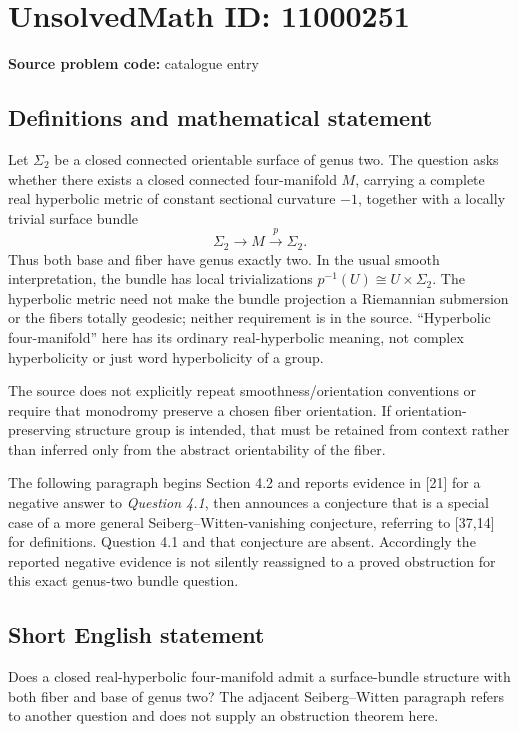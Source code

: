 \documentclass[11pt]{article}
\begin{document}
\section*{UnsolvedMath ID: 11000251}
\textbf{Source problem code:} catalogue entry
\subsection{Definitions and mathematical statement}
Let \(\Sigma_2\) be a closed connected orientable surface of genus two. The question asks whether there exists a closed connected four-manifold \(M\), carrying a complete real hyperbolic metric of constant sectional curvature \(-1\), together with a locally trivial surface bundle
\[\Sigma_2\longrightarrow M\xrightarrow{p}\Sigma_2.\]
Thus both base and fiber have genus exactly two. In the usual smooth interpretation, the bundle has local trivializations \(p^{-1}(U)\cong U\times\Sigma_2\). The hyperbolic metric need not make the bundle projection a Riemannian submersion or the fibers totally geodesic; neither requirement is in the source. ``Hyperbolic four-manifold'' here has its ordinary real-hyperbolic meaning, not complex hyperbolicity or just word hyperbolicity of a group.

The source does not explicitly repeat smoothness/orientation conventions or require that monodromy preserve a chosen fiber orientation. If orientation-preserving structure group is intended, that must be retained from context rather than inferred only from the abstract orientability of the fiber.

The following paragraph begins Section 4.2 and reports evidence in [21] for a negative answer to \emph{Question 4.1}, then announces a conjecture that is a special case of a more general Seiberg--Witten-vanishing conjecture, referring to [37,14] for definitions. Question 4.1 and that conjecture are absent. Accordingly the reported negative evidence is not silently reassigned to a proved obstruction for this exact genus-two bundle question.
\subsection{Short English statement}
Does a closed real-hyperbolic four-manifold admit a surface-bundle structure with both fiber and base of genus two? The adjacent Seiberg--Witten paragraph refers to another question and does not supply an obstruction theorem here.
\end{document}
